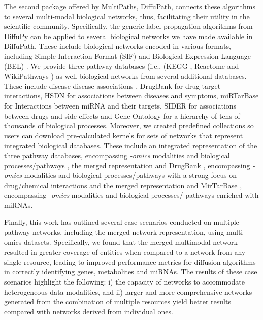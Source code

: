 The second package offered by MultiPaths, DiffuPath, connects these algorithms to several multi-modal biological networks, thus, facilitating their utility in the scientific community. Specifically, the generic label propagation algorithms from DiffuPy can be applied to several biological networks we have made available in DiffuPath. These include biological networks encoded in various formats, including Simple Interaction Format (SIF) and Biological Expression Language (BEL) \parencite{slater2012}. We provide three pathway databases (i.e., (KEGG \parencite{kanehisa2000}, Reactome \parencite{jassal2020} and WikiPathways \parencite{martens2021}) as well biological networks from several additional databases. These include disease-disease associations \parencite{menche2015}, DrugBank \parencite{wishart2018} for drug-target interactions, HSDN \parencite{zhou2014} for associations between diseases and symptoms, miRTarBase \parencite{huang2020} for Interactions between miRNA and their targets, SIDER \parencite{kuhn2016} for associations between drugs and side effects and Gene Ontology \parencite{ashburner2000} for a hierarchy of tens of thousands of biological processes. Moreover, we created predefined collections so users can download pre-calculated kernels for sets of networks that represent integrated biological databases. These include an integrated representation of the three pathway databases, encompassing \textit{-omics} modalities and biological processes/pathways \parencite{domingo2019}, the merged representation and DrugBank \parencite{wishart2018}, encompassing \textit{-omics} modalities and biological processes/pathways with a strong focus on drug/chemical interactions and the merged representation and MirTarBase \parencite{huang2020}, encompassing \textit{-omics} modalities and biological processes/ pathways enriched with miRNAs.

Finally, this work has outlined several case scenarios conducted on multiple pathway networks, including the merged network representation, using multi-omics datasets. Specifically, we found that the merged multimodal network resulted in greater coverage of entities when compared to a network from any single resource, leading to improved performance metrics for diffusion algorithms in correctly identifying genes, metabolites and miRNAs. The results of these case scenarios highlight the following: i) the capacity of networks to accommodate heterogeneous data modalities, and ii) larger and more comprehensive networks generated from the combination of multiple resources yield better results compared with networks derived from individual ones.

